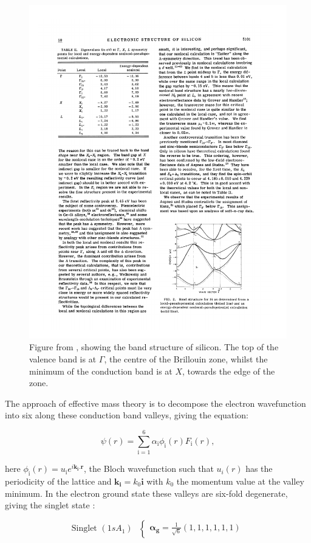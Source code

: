\begin{figure}
\centering
\includegraphics[width = 0.75\columnwidth]{Figures/siliconBandStructure.pdf}
\caption[Silicon band structure]{Figure from \cite{Chelikowsky1974}, showing the band structure of silicon. The top of the valence band is at $\Gamma$, the centre of the Brillouin zone, whilst the minimum of the conduction band is at $X$, towards the edge of the zone.}
\label{fig:siliconband}
\end{figure}

The approach of effective mass theory is to decompose the electron wavefunction into six along these conduction band valleys, giving the equation:

\begin{equation}
\psi(r) = \sum_{\text{i}=1}^6{\alpha_\text{i}\phi_\text{i}(r)F_\text{i}(r)},
\end{equation}

here $\phi_\text{i}(r) = u_\text{i} e^{i \bm{k_\text{i}.r}}$, the Bloch wavefunction such that $u_i(r)$ has the periodicity of the lattice and $\bm{k_\text{i}}=k_0\bm{\text{i}}$ with $k_0$ the momentum value at the valley minimum. 
In the electron ground state these valleys are six-fold degenerate, giving the singlet state \cite{Smit2004}:

\begin{equation}
\text{Singlet  } (1sA_{1}) \text{  }
\begin{cases}
\bm{\alpha_g} = \frac{1}{\sqrt{6}}(1, 1, 1, 1, 1, 1)
\end{cases}
\end{equation}

